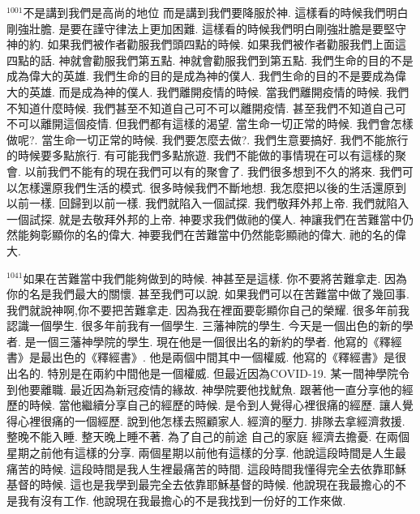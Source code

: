 \documentclass{book}
\begin{document}
$^{1001}$不是講到我們是高尚的地位 而是講到我們要降服於神.
這樣看的時候我們明白剛強壯膽.
是要在謹守律法上更加困難.
這樣看的時候我們明白剛強壯膽是要堅守神的約.
如果我們被作者勸服我們頭四點的時候.
如果我們被作者勸服我們上面這四點的話.
神就會勸服我們第五點.
神就會勸服我們到第五點.
我們生命的目的不是成為偉大的英雄.
我們生命的目的是成為神的僕人.
我們生命的目的不是要成為偉大的英雄.
而是成為神的僕人.
我們離開疫情的時候.
當我們離開疫情的時候.
我們不知道什麼時候.
我們甚至不知道自己可不可以離開疫情.
甚至我們不知道自己可不可以離開這個疫情.
但我們都有這樣的渴望.
當生命一切正常的時候.
我們會怎樣做呢?.
當生命一切正常的時候.
我們要怎麼去做?.
我們生意要搞好.
我們不能旅行的時候要多點旅行.
有可能我們多點旅遊.
我們不能做的事情現在可以有這樣的聚會.
以前我們不能有的現在我們可以有的聚會了.
我們很多想到不久的將來.
我們可以怎樣還原我們生活的模式.
很多時候我們不斷地想.
我怎麼把以後的生活還原到以前一樣.
回歸到以前一樣.
我們就陷入一個試探.
我們敬拜外邦上帝.
我們就陷入一個試探.
就是去敬拜外邦的上帝.
神要求我們做祂的僕人.
神讓我們在苦難當中仍然能夠彰顯你的名的偉大.
神要我們在苦難當中仍然能彰顯祂的偉大.
祂的名的偉大.

$^{1041}$如果在苦難當中我們能夠做到的時候.
神甚至是這樣.
你不要將苦難拿走.
因為你的名是我們最大的關懷.
甚至我們可以說.
如果我們可以在苦難當中做了幾回事.
我們就說神啊,你不要把苦難拿走.
因為我在裡面要彰顯你自己的榮耀.
很多年前我認識一個學生.
很多年前我有一個學生.
三藩神院的學生.
今天是一個出色的新的學者.
是一個三藩神學院的學生.
現在他是一個很出名的新約的學者.
他寫的《釋經書》是最出色的《釋經書》.
他是兩個中間其中一個權威.
他寫的《釋經書》是很出名的.
特別是在兩約中間他是一個權威.
但最近因為COVID-19.
某一間神學院令到他要離職.
最近因為新冠疫情的緣故.
神學院要他找魷魚.
跟著他一直分享他的經歷的時候.
當他繼續分享自己的經歷的時候.
是令到人覺得心裡很痛的經歷.
讓人覺得心裡很痛的一個經歷.
說到他怎樣去照顧家人.
經濟的壓力.
排隊去拿經濟救援.
整晚不能入睡.
整天晚上睡不著.
為了自己的前途 自己的家庭 經濟去擔憂.
在兩個星期之前他有這樣的分享.
兩個星期以前他有這樣的分享.
他說這段時間是人生最痛苦的時候.
這段時間是我人生裡最痛苦的時間.
這段時間我懂得完全去依靠耶穌基督的時候.
這也是我學到最完全去依靠耶穌基督的時候.
他說現在我最擔心的不是我有沒有工作.
他說現在我最擔心的不是我找到一份好的工作來做.
\end{document}
